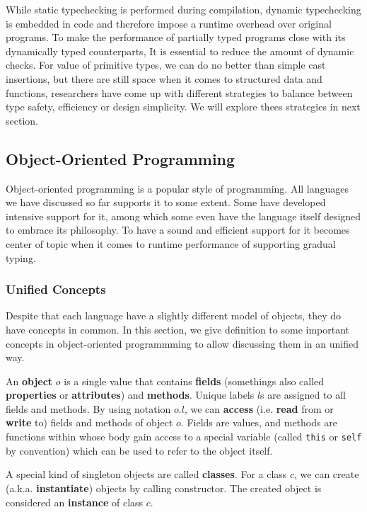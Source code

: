 While static typechecking is performed during compilation,
dynamic typechecking is embedded in code and therefore impose a runtime overhead over original programs.
To make the performance of partially typed programs close with its dynamically typed counterparts,
It is essential to reduce the amount of dynamic checks.
For value of primitive types, we can do no better than simple cast insertions,
but there are still space when it comes to structured data and functions,
researchers have come up with different strategies to balance between type safety, efficiency or design simplicity. We will explore thees strategies in next section.

\subsection{Object-Oriented Programming}

Object-oriented programming is a popular style of programming.
All languages we have discussed so far supports it to some extent.
Some have developed intensive support for it,
among which some even have the language itself designed to embrace its philosophy.
To have a sound and efficient support for it 
becomes center of topic when it comes to runtime performance of supporting gradual typing.

\subsubsection{Unified Concepts}

Despite that each language have a slightly different model of objects, they do have concepts
in common.
In this section, we give definition to some important concepts in object-oriented programmming
to allow discussing them in an unified way.

An \textbf{object} $o$ is a single value that contains \textbf{fields} (somethings also called
\textbf{properties} or \textbf{attributes}) and \textbf{methods}.
Unique labels $l$s are assigned to all fields and methods. By using notation $o.l$, we can \textbf{access}
(i.e. \textbf{read} from or \textbf{write} to) fields and methods of object $o$. 
Fields are values, and methods are functions within whose body gain access to a special variable
(called \texttt{this} or \texttt{self} by convention) which can be used to refer to the object itself.

A special kind of singleton objects are called \textbf{classes}.
For a class $c$, we can create (a.k.a. \textbf{instantiate}) objects by calling constructor.
The created object is considered an \textbf{instance} of class $c$.

